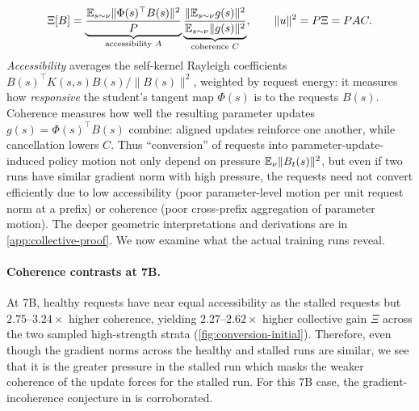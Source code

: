 \begin{equation}
\Xi[B]=
\underbrace{\frac{\mathbb{E}_{s\sim\nu}\|\Phi(s)^\top B(s)\|^2}{P}}_{\text{accessibility }A}
\underbrace{\frac{\|\mathbb{E}_{s\sim\nu} g(s)\|^2}{\mathbb{E}_{s\sim\nu}\|g(s)\|^2}}_{\text{coherence }C},
\qquad \|u\|^2=P\Xi=PAC.
\label{eq:pac}
\end{equation}
\emph{Accessibility} averages the self-kernel Rayleigh coefficients $B(s)^\top K(s,s)B(s)/\|B(s)\|^2$, weighted by request energy: it measures how \emph{responsive} the student's tangent map $\Phi(s)$ is to the requests $B(s)$. Coherence measures how well the resulting parameter updates $g(s)=\Phi(s)^\top B(s)$ combine: aligned updates reinforce one another, while cancellation lowers $C$. Thus ``conversion'' of requests into parameter-update-induced policy motion not only depend on pressure $\mathbb{E}_\nu\|B_t(s)\|^2$, but even if two runs have similar gradient norm with high pressure, the requests need not convert efficiently due to low accessibility (poor parameter-level motion per unit request norm at a prefix) or coherence (poor cross-prefix aggregation of parameter motion). The deeper geometric interpretations and derivations are in \cref{app:collective-proof}. We now examine what the actual training runs reveal.

\paragraph{Coherence contrasts at 7B.}
At 7B, healthy requests have near equal accessibility as the stalled requests but $2.75$--$3.24\times$ higher coherence, yielding $2.27$--$2.62\times$ higher collective gain $\Xi$ across the two sampled high-strength strata (\cref{fig:conversion-initial}). Therefore, even though the gradient norms across the healthy and stalled runs are similar, we see that it is the greater pressure in the stalled run which masks the weaker coherence of the update forces for the stalled run. For this 7B case, the gradient-incoherence conjecture in \citet{rethinking_opd_2026} is corroborated.

